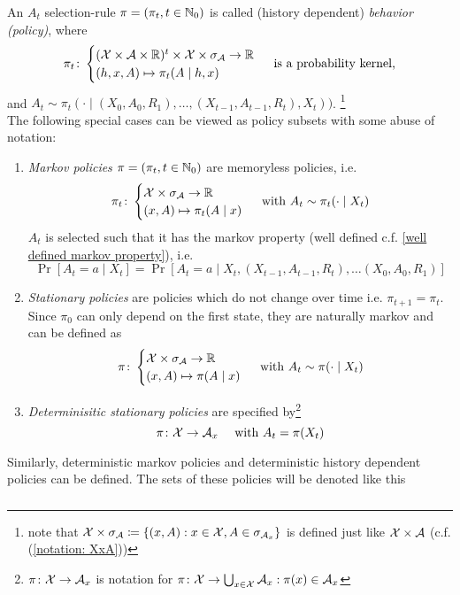 \begin{definition} 
	An \(A_t\) selection-rule \(\pi=(\pi_t,t\in\mathbb{N}_0)\) is called (history dependent) \emph{behavior (policy)}, where
	\[ 
		\pi_t\colon
		\begin{cases}
			(\mathcal{X}\times\mathcal{A}\times\mathbb{R})^t\times\mathcal{X}\times\sigma_{\mathcal{A}} \to \mathbb{R} \\
			(h,x,A)\mapsto \pi_t(A\mid h,x)
		\end{cases} \text{ is a probability kernel,}
	\]
	and \(A_t\sim \pi_t(\cdot\mid (X_0,A_0,R_1), \dots,(X_{t-1},A_{t-1},R_t),X_t))\).
	\footnote{ 
		note that \(\mathcal{X}\times\sigma_{\mathcal{A}}\coloneqq \{(x,A): x\in\mathcal{X}, A\in\sigma_{\mathcal{A}_x} \} \) is defined just like \(\mathcal{X}\times\mathcal{A}\) (c.f. (\ref{notation: XxA}))
	 } \\
	The following special cases can be viewed as policy subsets with some abuse of notation:
	\begin{enumerate}
		\item \emph{Markov policies} \(\pi=(\pi_t,t\in\mathbb{N}_0)\) are memoryless policies, i.e.
		\[
			\pi_t\colon
			\begin{cases}
				\mathcal{X}\times\sigma_{\mathcal{A}} \to \mathbb{R} \\
				(x,A)\mapsto \pi_t(A\mid x)
			\end{cases} 
			\text{ with } A_t\sim \pi_t(\cdot\mid X_t)
		\]
		\(A_t\) is selected such that it has the markov property (well defined c.f. \ref{well defined markov property}), i.e.
		\[\Pr[A_t=a\mid X_t]=\Pr[A_t=a\mid X_t, (X_{t-1},A_{t-1},R_t), \dots (X_0,A_0,R_1)] \]
		\item \emph{Stationary policies} are policies which do not change over time i.e. \(\pi_{t+1}=\pi_t\). Since \(\pi_0\) can only depend on the first state, they are naturally markov and can be defined as
		\[
			\pi\colon 
			\begin{cases}
				\mathcal{X}\times\sigma_{\mathcal{A}}\to\mathbb{R}\\
				(x,A)\mapsto \pi(A\mid x)
			\end{cases} 
			\text{ with } A_t\sim\pi(\cdot\mid X_t) 
		\]
		\item \emph{Determinisitic stationary policies} are specified by\footnote{
			\(\pi\colon\mathcal{X}\to\mathcal{A}_x\) is notation for \(\pi\colon\mathcal{X}\to\bigcup_{x\in\mathcal{X}} \mathcal{A}_x : \pi(x)\in\mathcal{A}_x \)
		}
		\[
			\pi\colon\mathcal{X}\to\mathcal{A}_x \quad\text{ with }A_t=\pi(X_t)
		\]
	\end{enumerate}
	Similarly, deterministic markov policies and deterministic history dependent policies can be defined. The sets of these policies will be denoted like this
	\[
	\begin{tikzcd}[row sep = small, column sep = small]

\end{tikzcd}\]
\end{definition}
